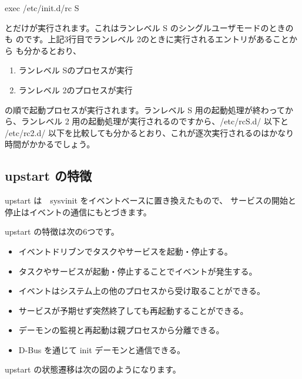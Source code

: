\documentclass[mingoth,a4paper]{jsarticle}
\begin{document}
\begin{commandline}
exec /etc/init.d/rc S
\end{commandline}

とだけが実行されます。これはランレベル S のシングルユーザモードのときのも
のです。上記3行目でランレベル 2のときに実行されるエントリがあることから
も分かるとおり、
\begin{enumerate}
 \item ランレベル Sのプロセスが実行
 \item ランレベル 2のプロセスが実行
\end{enumerate}
の順で起動プロセスが実行されます。ランレベル S 用の起動処理が終わってか
ら、ランレベル 2 用の起動処理が実行されるのですから、/etc/rcS.d/ 以下と
/etc/rc2.d/ 以下を比較しても分かるとおり、これが逐次実行されるのはかなり
時間がかかるでしょう。

\subsection{upstart の特徴}

upstart は　sysvinit をイベントベースに置き換えたもので、
サービスの開始と停止はイベントの通信にもとづきます。

upstart の特徴は次の6つです。

\begin{itemize}
 \item イベントドリブンでタスクやサービスを起動・停止する。
 \item タスクやサービスが起動・停止することでイベントが発生する。
 \item イベントはシステム上の他のプロセスから受け取ることができる。
 \item サービスが予期せず突然終了しても再起動することができる。
 \item デーモンの監視と再起動は親プロセスから分離できる。
 \item D-Bus を通じて init デーモンと通信できる。
\end{itemize}

upstart の状態遷移は次の図のようになります。
\end{document}
